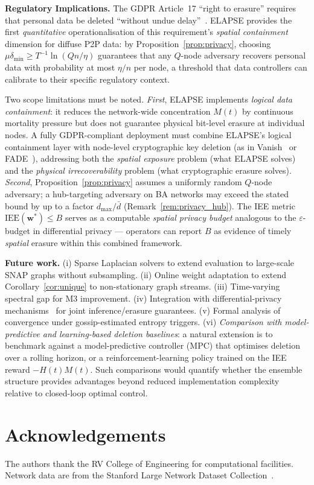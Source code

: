 \documentclass[review,12pt]{elsarticle}
\newcommand{\bfw}{\mathbf{w}}
\newcommand{\IEE}{\mathrm{IEE}}
\begin{document}
\textbf{Regulatory Implications.}
The GDPR Article~17 ``right to erasure'' requires that personal data be
deleted ``without undue delay''~\cite{gdpr2016}.  ELAPSE provides
the first \emph{quantitative} operationalisation of this requirement's
\emph{spatial containment} dimension for diffuse P2P data: by
Proposition~\ref{prop:privacy}, choosing
$\mu\delta_{\min} \geq T^{-1}\ln(Qn/\eta)$ guarantees that any
$Q$-node adversary recovers personal data with probability at most
$\eta/n$ per node, a threshold that data controllers can calibrate to
their specific regulatory context.

Two scope limitations must be noted.  \emph{First}, ELAPSE implements
\emph{logical data containment}: it reduces the network-wide concentration
$M(t)$ by continuous mortality pressure but does not guarantee
physical bit-level erasure at individual nodes.  A fully GDPR-compliant
deployment must combine ELAPSE's logical containment layer with
node-level cryptographic key deletion (as in Vanish~\cite{geambasu2009vanish}
or FADE~\cite{tang2010fade}), addressing both the \emph{spatial exposure}
problem (what ELAPSE solves) and the \emph{physical irrecoverability}
problem (what cryptographic erasure solves).
\emph{Second}, Proposition~\ref{prop:privacy} assumes a uniformly random
$Q$-node adversary; a hub-targeting adversary on BA networks may exceed
the stated bound by up to a factor $d_{\max}/\bar{d}$
(Remark~\ref{rem:privacy_hub}).
The IEE metric $\IEE(\bfw^*) \leq B$ serves as a computable \emph{spatial
privacy budget} analogous to the $\varepsilon$-budget in differential
privacy --- operators can report $B$ as evidence of timely \emph{spatial}
erasure within this combined framework.

\textbf{Future work.} (i) Sparse Laplacian solvers to extend evaluation to
large-scale SNAP graphs without subsampling. (ii) Online weight adaptation to
extend Corollary~\ref{cor:unique} to non-stationary graph streams.
(iii) Time-varying spectral gap for M3 improvement.
(iv) Integration with differential-privacy
mechanisms~\cite{dwork2014algorithmic} for joint inference/erasure guarantees.
(v) Formal analysis of convergence under gossip-estimated entropy triggers.
(vi) \emph{Comparison with model-predictive and learning-based deletion
baselines}: a natural extension is to benchmark against a model-predictive
controller (MPC) that optimises deletion over a rolling horizon, or a
reinforcement-learning policy trained on the IEE reward $-H(t)M(t)$.
Such comparisons would quantify whether the ensemble structure provides
advantages beyond reduced implementation complexity relative to
closed-loop optimal control.

\section*{Acknowledgements}

The authors thank the RV College of Engineering for computational facilities.
Network data are from the Stanford Large Network Dataset
Collection~\cite{snapnets}.



\end{document}
